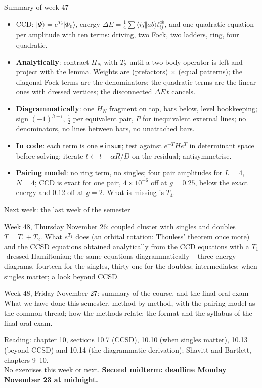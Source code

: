 \documentclass[aspectratio=169,10pt]{beamer}
\newcommand{\ket}[1]{\vert #1\rangle}
\newcommand{\ph}{\Phi_0}
\newcommand{\as}[4]{\langle #1#2\Vert #3#4\rangle}
\begin{document}
\begin{frame}{Summary of week 47}
\begin{itemize}
\item CCD: $\ket{\Psi}=e^{T_2}\ket{\ph}$, energy $\Delta E=\tfrac14\sum\as ijab t_{ij}^{ab}$, and one quadratic equation per amplitude with ten terms: driving, two Fock, two ladders, ring, four quadratic.
\item \textbf{Analytically}: contract $H_N$ with $T_2$ until a two-body operator is left and project with the lemma. Weights are (prefactors) $\times$ (equal patterns); the diagonal Fock terms are the denominators; the quadratic terms are the linear ones with dressed vertices; the disconnected $\Delta E\,t$ cancels.
\item \textbf{Diagrammatically}: one $H_N$ fragment on top, bars below, level bookkeeping; sign $(-1)^{h+l}$, $\tfrac12$ per equivalent pair, $P$ for inequivalent external lines; no denominators, no lines between bars, no unattached bars.
\item \textbf{In code}: each term is one \texttt{einsum}; test against $e^{-T}He^{T}$ in determinant space before solving; iterate $t\leftarrow t+\alpha R/D$ on the residual; antisymmetrise.
\item \textbf{Pairing model}: no ring term, no singles; four pair amplitudes for $L=4$, $N=4$; CCD is exact for one pair, $4\times10^{-6}$ off at $g=0.25$, below the exact energy and $0.12$ off at $g=2$. What is missing is $T_4$.
\end{itemize}
\end{frame}

\begin{frame}{Next week: the last week of the semester}
  \begin{exampleblock}{Week 48, Thursday November 26: coupled cluster with singles and doubles}
    \small
    $T=T_1+T_2$. What $e^{T_1}$ does (an orbital rotation: Thouless' theorem once more) and the CCSD equations obtained analytically from the CCD equations with a $T_1$-dressed Hamiltonian; the same equations diagrammatically -- three energy diagrams, fourteen for the singles, thirty-one for the doubles; intermediates; when singles matter; a look beyond CCSD.
  \end{exampleblock}
  \begin{exampleblock}{Week 48, Friday November 27: summary of the course, and the final oral exam}
    \small
    What we have done this semester, method by method, with the pairing model as the common thread; how the methods relate; the format and the syllabus of the final oral exam.
  \end{exampleblock}
  \vspace{0.4em}
  \small
  Reading: chapter 10, sections 10.7 (CCSD), 10.10 (when singles matter), 10.13 (beyond CCSD) and 10.14 (the diagrammatic derivation); Shavitt and Bartlett, chapters 9--10.\\[0.3em]
  No exercises this week or next. \textbf{Second midterm: deadline Monday November 23 at midnight.}
\end{frame}
\end{document}
